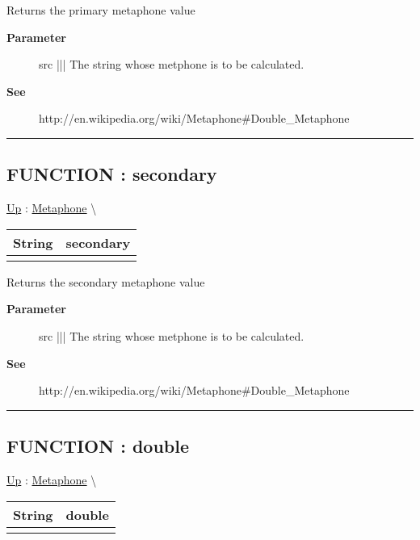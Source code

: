 \par
Returns the primary metaphone value

\par
\begin{description}
\item [\textbf{Parameter}] src ||| The string whose metphone is to be calculated.
\item [\textbf{See}] http://en.wikipedia.org/wiki/Metaphone\#Double\_Metaphone
\end{description}

\rule{\linewidth}{0.5pt}
\subsection*{FUNCTION : secondary}
\hypertarget{ecldoc:metaphone.secondary}{}
\hyperlink{ecldoc:Metaphone}{Up} :
\hspace{0pt} \hyperlink{ecldoc:Metaphone}{Metaphone} \textbackslash 

{\renewcommand{\arraystretch}{1.5}
\begin{tabularx}{\textwidth}{|>{\raggedright\arraybackslash}l|X|}
\hline
\hspace{0pt}String & secondary \\
\hline
\multicolumn{2}{|>{\raggedright\arraybackslash}X|}{\hspace{0pt}(STRING src)} \\
\hline
\end{tabularx}
}

\par
Returns the secondary metaphone value

\par
\begin{description}
\item [\textbf{Parameter}] src ||| The string whose metphone is to be calculated.
\item [\textbf{See}] http://en.wikipedia.org/wiki/Metaphone\#Double\_Metaphone
\end{description}

\rule{\linewidth}{0.5pt}
\subsection*{FUNCTION : double}
\hypertarget{ecldoc:metaphone.double}{}
\hyperlink{ecldoc:Metaphone}{Up} :
\hspace{0pt} \hyperlink{ecldoc:Metaphone}{Metaphone} \textbackslash 

{\renewcommand{\arraystretch}{1.5}
\begin{tabularx}{\textwidth}{|>{\raggedright\arraybackslash}l|X|}
\hline
\hspace{0pt}String & double \\
\hline
\multicolumn{2}{|>{\raggedright\arraybackslash}X|}{\hspace{0pt}(STRING src)} \\
\hline
\end{tabularx}
}

